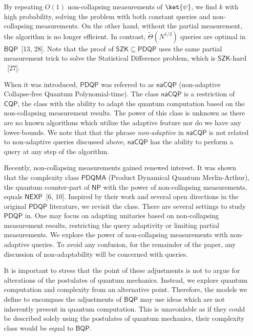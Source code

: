 \documentclass[10pt,a4paper]{article}
\begin{document}
By repeating $O(1)$ non-collapsing measurements of $\ket{\psi}$, we find $k$ with high probability, solving the problem with both constant queries and non-collapsing measurements. On the other hand, without the partial measurement, the algorithm is no longer efficient. In contrast, $\tilde{\Theta}(N^{1/3})$ queries are optimal in $\mathsf{BQP}$ [13, 28]. Note that the proof of $\mathsf{SZK}\subseteq\mathsf{PDQP}$ uses the same partial measurement trick to solve the Statistical Difference problem, which is $\mathsf{SZK}\text{-hard}$ [27].\par




When it was introduced, $\mathsf{PDQP}$ was referred to as $\mathsf{naCQP}$ (non-adaptive Collapse-free Quantum Polynomial-time). The class $\mathsf{naCQP}$ is a restriction of $\mathsf{CQP}$, the class with the ability to adapt the quantum computation based on the non-collapsing measurement results. The power of this class is unknown as there are no known algorithms which utilize the adaptive feature nor do we have any lower-bounds. We note that that the phrase \emph{non-adaptive} in $\mathsf{naCQP}$ is not related to non-adaptive queries discussed above, $\mathsf{naCQP}$ has the ability to perform a query at any step of the algorithm.\par




Recently, non-collapsing measurements gained renewed interest. It was shown that the complexity class $\mathsf{PDQMA}$ (Product Dynamical Quantum Merlin-Arthur), the quantum counter-part of $\mathsf{NP}$ with the power of non-collapsing measurements, equals $\mathsf{NEXP}$ [6, 10]. Inspired by their work and several open directions in the original $\mathsf{PDQP}$ literature, we revisit the class.
There are several settings to study $\mathsf{PDQP}$ in. One may focus on adapting unitaries based on non-collapsing measurement results, restricting the query adaptivity or limiting partial measurements. We explore the power of non-collapsing measurements with non-adaptive queries. To avoid any confusion, for the remainder of the paper, any discussion of non-adaptability will be concerned with queries.\par




It is important to stress that the point of these adjustments is not to argue for alterations of the postulates of quantum mechanics. Instead, we explore quantum computation and complexity from an alternative point. Therefore, the models we define to encompass the adjustments of $\mathsf{BQP}$ may use ideas which are not inherently present in quantum computation. This is unavoidable as if they could be described solely using the postulates of quantum mechanics, their complexity class would be equal to $\mathsf{BQP}$.\par
\end{document}
